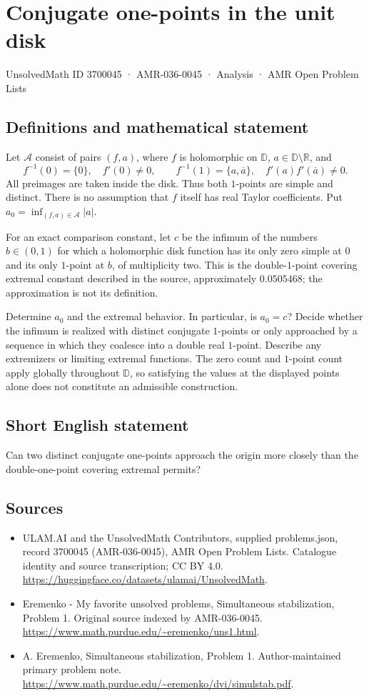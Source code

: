 \documentclass[11pt,a4paper]{article}
\begin{document}
\section*{Conjugate one-points in the unit disk}\label{3700045}
{\small UnsolvedMath ID 3700045 · AMR-036-0045 · Analysis · AMR Open Problem Lists}
\subsection{Definitions and mathematical statement}
Let $\mathcal A$ consist of pairs $(f,a)$,
where $f$ is holomorphic on $\mathbb D$,
$a\in\mathbb D\setminus\mathbb R$, and
\[
 f^{-1}(0)=\{0\},\quad f'(0)\ne0,\qquad
 f^{-1}(1)=\{a,\overline a\},\quad
 f'(a)f'(\overline a)\ne0.
\]
All preimages are taken inside the disk.
Thus both $1$-points are simple and distinct.
There is no assumption that $f$ itself has
real Taylor coefficients.
Put $a_0=\inf_{(f,a)\in\mathcal A}|a|$.

For an exact comparison constant, let $c$ be
the infimum of the numbers $b\in(0,1)$
for which a holomorphic disk function has
its only zero simple at $0$ and its
only $1$-point at $b$, of multiplicity two.
This is the double-$1$-point covering extremal
constant described in the source, approximately
$0.0505468$; the approximation is not its
definition.

Determine $a_0$ and the extremal behavior.
In particular, is $a_0=c$? Decide whether
the infimum is realized with distinct
conjugate $1$-points or only approached by
a sequence in which they coalesce into a
double real $1$-point. Describe any extremizers
or limiting extremal functions.
The zero count and $1$-point count apply
globally throughout $\mathbb D$, so satisfying
the values at the displayed points alone
does not constitute an admissible construction.
\subsection{Short English statement}
Can two distinct conjugate one-points approach the origin more closely than the double-one-point covering extremal permits?
\subsection{Sources}
\begin{itemize}
\item[S1] ULAM.AI and the UnsolvedMath Contributors, supplied problems.json, record 3700045 (AMR-036-0045), AMR Open Problem Lists. Catalogue identity and source transcription; CC BY 4.0.
\url{https://huggingface.co/datasets/ulamai/UnsolvedMath}.
\item[S2] Eremenko - My favorite unsolved problems, Simultaneous stabilization, Problem 1. Original source indexed by AMR-036-0045.
\url{https://www.math.purdue.edu/~eremenko/uns1.html}.
\item[S3] A. Eremenko, Simultaneous stabilization, Problem 1. Author-maintained primary problem note.
\url{https://www.math.purdue.edu/~eremenko/dvi/simulstab.pdf}.
\end{itemize}
\end{document}
